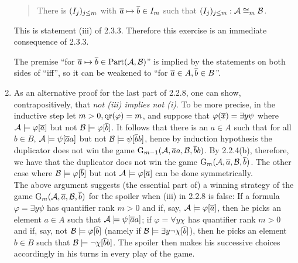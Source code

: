 \begin{enumerate}[1.]
\begin{quote}
There is $(I_j)_{j \leq m}$ with $\overline{a} \mapsto \overline{b} \in I_m$ such that $\seqi{I_j}{j \leq m} : \strct{A} \isom[m] \strct{B}$.
\end{quote}
This is statement (iii) of 2.3.3. Therefore this exercise is an immediate consequence of 2.3.3.
\begin{remark}
The premise ``for $\overline{a} \mapsto \overline{b} \in {\mathrm{Part}(\mathcal{A}, \mathcal{B})}$'' is implied by the statements on both sides of ``iff'', so it can be weakened to ``for $\overline{a} \in A, \overline{b} \in B$''.
\end{remark}
%
\item {} As an alternative proof for the last part of 2.2.8, one can show, contrapositively, that \emph{not (iii) implies not (i)}. To be more precise, in the inductive step let $m > 0, {\mathrm{qr}({\varphi})} = m$, and suppose that $\varphi(\overline{x}) = \exists y \psi$ where $\mathcal{A} \models \varphi[\overline{a}]$ but not $\mathcal{B} \models \varphi[\overline{b}]$. It follows that there is an $a \in A$ such that for all $b \in B$, $\mathcal{A} \models \psi[\overline{a}a]$ but not $\mathcal{B} \models \psi[\overline{b}b]$, hence by induction hypothesis the duplicator does not win the game $\game{m - 1}{\strct{A}, \vect{a}a, \strct{B}, \vect{b}b}$. By 2.2.4(b), therefore, we have that the duplicator does not win the game $\game{m}{\strct{A}, \vect{a}, \strct{B}, \vect{b}}$. The other case where $\mathcal{B} \models \varphi[\overline{b}]$ but not $\mathcal{A} \models \varphi[\overline{a}]$ can be done symmetrically.
\medskip\\
The above argument suggests (the essential part of) a winning strategy of the game $\game{m}{\strct{A}, \vect{a}, \strct{B}, \vect{b}}$ for the spoiler when (iii) in 2.2.8 is false: If a formula $\varphi = \exists y \psi$ has quantifier rank $m > 0$ and if, say, $\mathcal{A} \models \varphi[\overline{a}]$, then he picks an element $a \in A$ such that $\mathcal{A} \models \psi[\overline{a}a]$; if $\varphi = \forall y \chi$ has quantifier rank $m > 0$ and if, say, not $\mathcal{B} \models \varphi[\overline{b}]$ (namely if $\mathcal{B} \models \exists y \neg\chi[\overline{b}]$), then he picks an element $b \in B$ such that $\mathcal{B} \models \neg\chi[\overline{b}b]$. The spoiler then makes his successive choices accordingly in his turns in every play of the game.
%
\end{enumerate}


